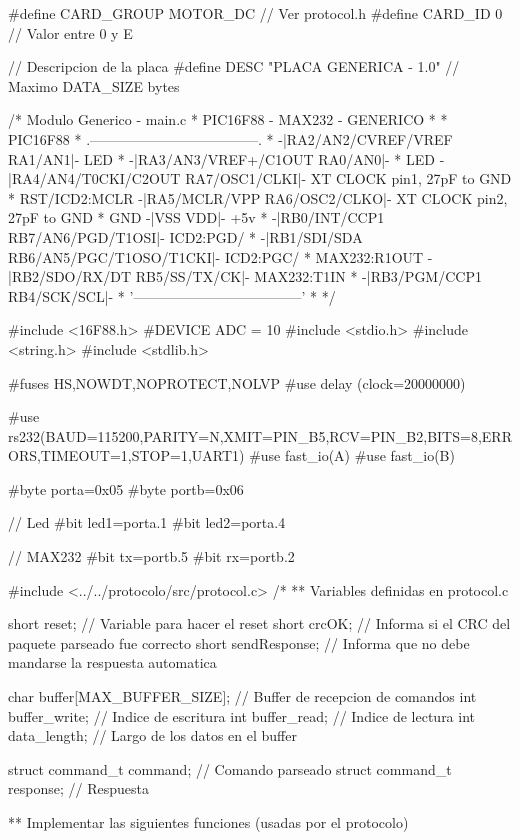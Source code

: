 {\scriptsize
\begin{verbatimtab}
#define CARD_GROUP	MOTOR_DC	// Ver protocol.h
#define CARD_ID		0		// Valor entre 0 y E

// Descripcion de la placa
#define DESC		"PLACA GENERICA - 1.0" // Maximo DATA_SIZE bytes

/* Modulo Generico - main.c
 * PIC16F88 - MAX232 - GENERICO
 *
 *                               PIC16F88
 *                .------------------------------------.
 *               -|RA2/AN2/CVREF/VREF           RA1/AN1|- LED
 *               -|RA3/AN3/VREF+/C1OUT          RA0/AN0|- 
 *           LED -|RA4/AN4/T0CKI/C2OUT    RA7/OSC1/CLKI|- XT CLOCK pin1, 27pF to GND
 * RST/ICD2:MCLR -|RA5/MCLR/VPP           RA6/OSC2/CLKO|- XT CLOCK pin2, 27pF to GND
 *           GND -|VSS                              VDD|- +5v
 *               -|RB0/INT/CCP1       RB7/AN6/PGD/T1OSI|- ICD2:PGD/
 *               -|RB1/SDI/SDA  RB6/AN5/PGC/T1OSO/T1CKI|- ICD2:PGC/
 *  MAX232:R1OUT -|RB2/SDO/RX/DT           RB5/SS/TX/CK|- MAX232:T1IN
 *               -|RB3/PGM/CCP1             RB4/SCK/SCL|- 
 *                '------------------------------------'
 *    
 */

#include <16F88.h>
#DEVICE ADC = 10
#include <stdio.h>
#include <string.h>
#include <stdlib.h>

#fuses HS,NOWDT,NOPROTECT,NOLVP
#use delay (clock=20000000)

#use rs232(BAUD=115200,PARITY=N,XMIT=PIN_B5,RCV=PIN_B2,BITS=8,ERRORS,TIMEOUT=1,STOP=1,UART1)
#use fast_io(A)
#use fast_io(B)

#byte porta=0x05
#byte portb=0x06

// Led
#bit led1=porta.1
#bit led2=porta.4

// MAX232
#bit tx=portb.5
#bit rx=portb.2

#include <../../protocolo/src/protocol.c>
/*
** Variables definidas en protocol.c

short reset; // Variable para hacer el reset
short crcOK; // Informa si el CRC del paquete parseado fue correcto
short sendResponse; // Informa que no debe mandarse la respuesta automatica

char buffer[MAX_BUFFER_SIZE];	// Buffer de recepcion de comandos
int buffer_write;		// Indice de escritura
int buffer_read;		// Indice de lectura
int data_length;		// Largo de los datos en el buffer

struct command_t command; 	// Comando parseado
struct command_t response; 	// Respuesta

** Implementar las siguientes funciones (usadas por el protocolo)


\end{verbatimtab}}
